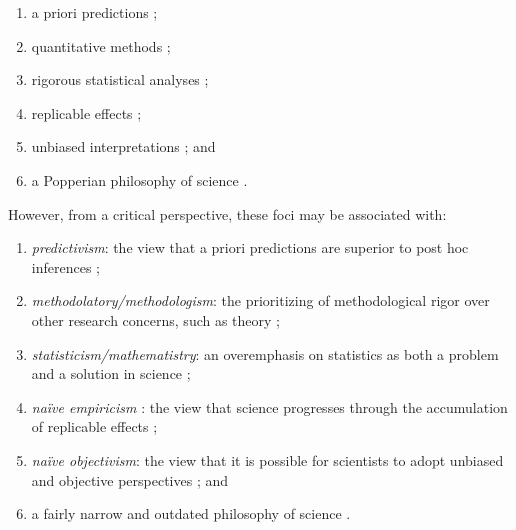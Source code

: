 \documentclass[authordate, meta]{jote-new-article}
\begin{document}
\begin{enumerate}


  \item a priori predictions \parencites[e.g.,][p. 36]{Chambers2022}[p. 154]{Simmons2021};



  \item quantitative methods \parencites{Bennett2021}[p. 691]{Hamlin2017}[p. 530]{Pownall2021};


  \item rigorous statistical analyses \parencites[for a review, see][]{Moody2022};


  \item replicable effects \parencites[e.g.,][p. 617]{Nosek2012}[p. 153]{Simmons2021};



  \item unbiased interpretations \parencites[e.g.,][]{Hardwicke2023}[p. 166]{Vazire2022}; and



  \item a Popperian philosophy of science \parencites{Flis2019}[p. 74]{Grossmann2021}{Morawski2019}{Morawski2022}[for examples, see][]{Derksen2019}.


\end{enumerate}

However, from a critical perspective, these foci may be associated with:

\begin{enumerate}


  \item \emph{predictivism}: the view that a priori predictions are superior to post hoc inferences \parencites[p. 1605]{Oberauer2019a}{Rubin2017b}{Rubin2022};



  \item \emph{methodolatory/methodologism}: the prioritizing of methodological rigor over other research concerns, such as theory \parencites{Chamberlain2000}[p. 5]{Danziger1990}{Gao2014};



  \item \emph{statisticism/mathematistry}: an overemphasis on statistics as both a problem and a solution in science \parencites{Boring1919}{Brower1949}{Fiedler2018}{Proulx2021};


  \item \emph{naïve empiricism} \parencites{Strong1991}: the view that science progresses through the accumulation of replicable effects \parencites{Flis2022}{Proulx2021}{vanRooij2021};


  \item \emph{naïve objectivism}: the view that it is possible for scientists to adopt unbiased and objective perspectives \parencites{Field2021}{Penders2022}{Wiggins2019}; and



  \item a fairly narrow and outdated philosophy of science \parencites{Derksen2019}[p. 170]{Flis2019}[p. 74]{Grossmann2021}[p. 226, p. 233]{Morawski2019}.


\end{enumerate}
\end{document}
